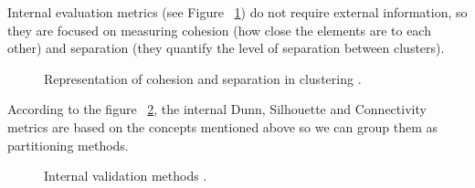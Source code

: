 Internal evaluation metrics (see Figure ~\ref{fig:cohesion}) do not require external information, so they are focused on measuring cohesion (how close the elements are to each other) and separation (they quantify the level of separation between clusters).

\begin{figure}[htbp]
  \centering
    \caption{Representation of cohesion and separation in clustering \citep{b54}.}%
    \label{fig:cohesion}%
\end{figure}

According to the figure ~\ref{fig:internal}, the internal Dunn, Silhouette and Connectivity metrics are based on the concepts mentioned above so we can group them as partitioning methods.

\begin{figure}[htbp]
  \centering
    \caption{Internal validation methods \citep{b54}.}%
    \label{fig:internal}%
\end{figure}

